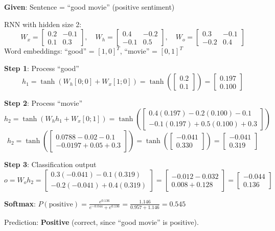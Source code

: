 \documentclass[11pt,a4paper]{article}
\begin{document}
\begin{tcolorbox}[colback=green!5!white,colframe=green!75!black,title=\textbf{Worked Example 29: RNN Sequence Classification}]
\textbf{Given}: Sentence = ``good movie'' (positive sentiment)

RNN with hidden size 2:
\[
W_x = \begin{bmatrix} 0.2 & -0.1 \\ 0.1 & 0.3 \end{bmatrix}, \quad
W_h = \begin{bmatrix} 0.4 & -0.2 \\ -0.1 & 0.5 \end{bmatrix}, \quad
W_o = \begin{bmatrix} 0.3 & -0.1 \\ -0.2 & 0.4 \end{bmatrix}
\]
Word embeddings: ``good'' = $[1, 0]^T$, ``movie'' = $[0, 1]^T$

\textbf{Step 1}: Process ``good''
\[
h_1 = \tanh(W_h [0;0] + W_x [1;0]) = \tanh\left(\begin{bmatrix} 0.2 \\ 0.1 \end{bmatrix}\right) = \begin{bmatrix} 0.197 \\ 0.100 \end{bmatrix}
\]

\textbf{Step 2}: Process ``movie''
\[
h_2 = \tanh(W_h h_1 + W_x [0;1]) = \tanh\left(\begin{bmatrix} 0.4(0.197) - 0.2(0.100) - 0.1 \\ -0.1(0.197) + 0.5(0.100) + 0.3 \end{bmatrix}\right)
\]
\[
h_2 = \tanh\left(\begin{bmatrix} 0.0788 - 0.02 - 0.1 \\ -0.0197 + 0.05 + 0.3 \end{bmatrix}\right) = \tanh\left(\begin{bmatrix} -0.041 \\ 0.330 \end{bmatrix}\right) = \begin{bmatrix} -0.041 \\ 0.319 \end{bmatrix}
\]

\textbf{Step 3}: Classification output
\[
o = W_o h_2 = \begin{bmatrix} 0.3(-0.041) - 0.1(0.319) \\ -0.2(-0.041) + 0.4(0.319) \end{bmatrix} = \begin{bmatrix} -0.012 - 0.032 \\ 0.008 + 0.128 \end{bmatrix} = \begin{bmatrix} -0.044 \\ 0.136 \end{bmatrix}
\]

\textbf{Softmax}: $P(\text{positive}) = \frac{e^{0.136}}{e^{-0.044} + e^{0.136}} = \frac{1.146}{0.957 + 1.146} = 0.545$

Prediction: \textbf{Positive} (correct, since ``good movie'' is positive).
\end{tcolorbox}
\end{document}
